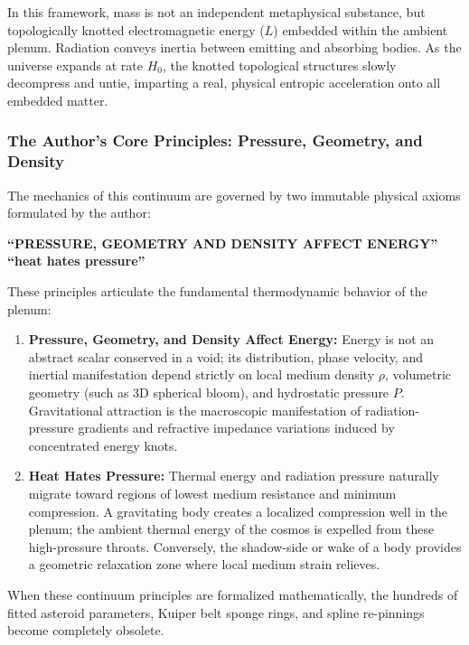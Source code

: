\documentclass[11pt,a4paper]{article}
\begin{document}
In this framework, mass is not an independent metaphysical substance, but topologically knotted electromagnetic energy ($L$) embedded within the ambient plenum. Radiation conveys inertia between emitting and absorbing bodies. As the universe expands at rate $H_0$, the knotted topological structures slowly decompress and untie, imparting a real, physical entropic acceleration onto all embedded matter.

\subsubsection{The Author's Core Principles: Pressure, Geometry, and Density}
\label{subsubsec:core_principles}

The mechanics of this continuum are governed by two immutable physical axioms formulated by the author:
\begin{center}
\textbf{``PRESSURE, GEOMETRY AND DENSITY AFFECT ENERGY''}\\[0.3em]
\textbf{``heat hates pressure''}
\end{center}

These principles articulate the fundamental thermodynamic behavior of the plenum:
\begin{enumerate}
    \item \textbf{Pressure, Geometry, and Density Affect Energy:} Energy is not an abstract scalar conserved in a void; its distribution, phase velocity, and inertial manifestation depend strictly on local medium density $\rho$, volumetric geometry (such as 3D spherical bloom), and hydrostatic pressure $P$. Gravitational attraction is the macroscopic manifestation of radiation-pressure gradients and refractive impedance variations induced by concentrated energy knots.
    \item \textbf{Heat Hates Pressure:} Thermal energy and radiation pressure naturally migrate toward regions of lowest medium resistance and minimum compression. A gravitating body creates a localized compression well in the plenum; the ambient thermal energy of the cosmos is expelled from these high-pressure throats. Conversely, the shadow-side or wake of a body provides a geometric relaxation zone where local medium strain relieves.
\end{enumerate}

When these continuum principles are formalized mathematically, the hundreds of fitted asteroid parameters, Kuiper belt sponge rings, and spline re-pinnings become completely obsolete.
\end{document}
